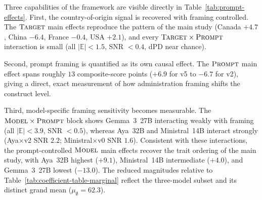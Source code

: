Three capabilities of the framework are visible directly in Table~\ref{tab:prompt-effects}. 
First, the country-of-origin signal is recovered with framing controlled. 
The $\textsc{Target}$ main effects reproduce the pattern of the main study (Canada $+4.7$, China $-6.4$, France $-0.4$, USA $+2.1$), and every $\textsc{Target}\times\textsc{Prompt}$ interaction is small (all
$|\mathbb{E}|<1.5$, SNR $<0.4$, dPD near chance). 

Second, prompt framing is quantified as its own causal effect. 
The $\textsc{Prompt}$ main effect spans roughly $13$ composite-score points ($+6.9$ for v5 to $-6.7$ for v2), giving a direct, exact measurement of how administration framing shifts the construct
level. 

Third, model-specific framing sensitivity becomes measurable. 
The $\textsc{Model}\times\textsc{Prompt}$ block shows Gemma~3~27B interacting weakly with framing (all $|\mathbb{E}|<3.9$, SNR $<0.5$), 
whereas Aya~32B and Ministral~14B interact strongly (Aya$\times$v2 SNR $2.2$; Ministral$\times$v0
SNR $1.6$). 
Consistent with these interactions, the prompt-controlled $\textsc{Model}$ main effects recover the trait ordering of the main study, with Aya~32B highest ($+9.1$), Ministral~14B intermediate ($+4.0$), and Gemma~3~27B lowest ($-13.0$). 
The reduced magnitudes relative to Table~\ref{tab:coefficient-table-marginal} reflect the three-model subset and its distinct grand mean ($\mu_\emptyset=62.3$).


